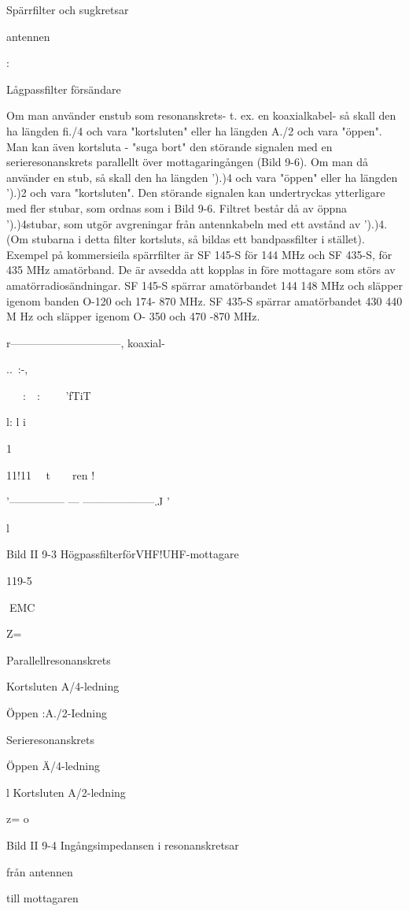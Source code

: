 \documentclass[a4paper,twoside,twocolumn,openright]{book}
\begin{document}
{{{{{Spärrfilter och sugkretsar

antennen

:

Lågpassfilter
försändare

Om man använder enstub som resonanskrets- t. ex. en koaxialkabel- så skall den ha
längden fi./4 och vara "kortsluten" eller ha
längden A./2 och vara "öppen".
Man kan även kortsluta - "suga bort" den störande signalen med en serieresonanskrets parallellt över mottagaringången
(Bild 9-6). Om man då använder en stub, så
skall den ha längden ').)4 och vara "öppen"
eller ha längden ').)2 och vara "kortsluten".
Den störande signalen kan undertryckas
ytterligare med fler stubar, som ordnas som
i Bild 9-6. Filtret består då av öppna ').)4stubar, som utgör avgreningar från antennkabeln med ett avstånd av ').)4.
(Om stubarna i detta filter kortsluts, så
bildas ett bandpassfilter i stället).
Exempel på kommersieila spärrfilter är SF
145-S för 144 MHz och SF 435-S, för 435
MHz amatörband. De är avsedda att kopplas in före mottagare som störs av amatörradiosändningar.
SF 145-S spärrar amatörbandet 144 148 MHz och släpper igenom banden O-120
och 174- 870 MHz.
SF 435-S spärrar amatörbandet 430 440 M Hz och släpper igenom O- 350 och 470
-870 MHz.

r------------------------------, koaxial-

..~:-,

~~~:~~:~ ~~~'fTiT

l: l
i

1

11!11 ~~t~~~~ren
!

'--------------- --- --------------------.J
'

l

Bild II 9-3
HögpassfilterförVHF!UHF-mottagare

119-5

EMC

Z=~

Parallellresonanskrets

Kortsluten A/4-ledning

Öppen :A./2-Iedning

Serieresonanskrets

Öppen Ä/4-ledning

l Kortsluten A/2-ledning

z= o

Bild II 9-4 Ingångsimpedansen i resonanskretsar

från
antennen

till
mottagaren

}}}}}
\end{document}
